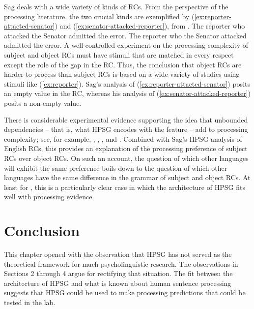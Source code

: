 \documentclass[output=paper
                ,modfonts
                ,nonflat
	        ,collection
	        ,collectionchapter
	        ,collectiontoclongg
 	        ,biblatex
                ,babelshorthands
                ,newtxmath
                ,draftmode
                ,colorlinks, citecolor=brown
]{./langsci/langscibook}
\begin{document}
Sag deals with a wide variety of kinds of RCs. From the perspective of the processing literature, the two crucial kinds are exemplified by (\ref{ex:reporter-attacted-senator}) and (\ref{ex:senator-attacked-reporter}), from \citet{Gibson98a}.
\eal\label{ex:reporter}
\ex The reporter who attacked the Senator admitted the error.\label{ex:reporter-attacted-senator}
\ex The reporter who the Senator attacked admitted the error.\label{ex:senator-attacked-reporter}
\zl
A well-controlled experiment on the processing complexity of subject and object RCs must have stimuli that are matched in every respect except the role of the gap in the RC.  Thus, the conclusion that object RCs are harder to process than subject RCs is based on a wide variety of studies using stimuli like (\ref{ex:reporter}).  Sag's analysis of (\ref{ex:reporter-attacted-senator}) posits an empty \isi{\slasch} value in the RC, whereas his analysis of (\ref{ex:senator-attacked-reporter}) posits a non-empty \slasch value.  

There is considerable experimental evidence supporting the idea that unbound\-ed dependencies -- that is, what HPSG encodes with the \isi{\slasch} feature -- add to processing complexity; see, for example, \citet{WannerMaratsos78}, \citet{KingJust91}, \citet{KluenderKutas93}, and \citet{Hawkins99a}.  Combined with Sag's HPSG analysis of English RCs, this provides an explanation of the processing preference of subject RCs over object RCs.  On such an account, the question of which other languages will exhibit the same preference boils down to the question of which other languages have the same difference in the grammar of subject and object RCs.  At least for , this is a particularly clear case in which the architecture of HPSG fits well with processing evidence.

\section{Conclusion}

This chapter opened with the observation that HPSG has not served as the theoretical framework for much psycholinguistic research.  The observations in Sections 2 through 4 argue for rectifying that situation.  The fit between the architecture of HPSG and what is known about human sentence processing suggests that HPSG could be used to make processing predictions that could be tested in the lab.  
\end{document}
